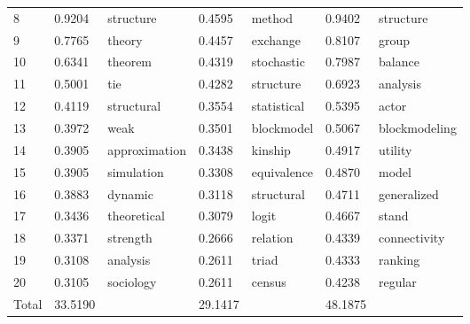 \documentclass[11pt]{article} %
\begin{document}
\begin{center}
\begin{longtable}{p{0.7cm}|p{1.3cm}|p{2.6cm}||p{1.3cm}|p{2.6cm}||p{1.3cm}|p{2.6cm}}
         8   &  0.9204   &  structure	 &     0.4595   &  method		 &     0.9402  &   structure \\
         9   &  0.7765   &  theory		 &     0.4457   &  exchange	 &     0.8107  &   group \\
        10   &  0.6341   &  theorem	 &     0.4319   &  stochastic	 &     0.7987  &   balance \\
        11   &  0.5001   &  tie		 &     0.4282   &  structure	 &     0.6923  &   analysis \\
        12   &  0.4119   &  structural	 &     0.3554   &  statistical	 &     0.5395  &   actor \\
        13   &  0.3972   &  weak		 &     0.3501   &  blockmodel	 &     0.5067  &   blockmodeling \\
        14   &  0.3905   &  approximation	 &     0.3438   &  kinship		 &     0.4917  &   utility \\
        15   &  0.3905   &  simulation	 &     0.3308   &  equivalence	 &     0.4870  &   model \\
        16   &  0.3883   &  dynamic	 &     0.3118   &  structural	 &     0.4711  &   generalized \\
        17   &  0.3436   &  theoretical	 &     0.3079   &  logit		 &     0.4667  &   stand \\
        18   &  0.3371   &  strength	 &     0.2666   &  relation	 &     0.4339  &   connectivity \\
        19   &  0.3108   &  analysis	 &     0.2611   &  triad		 &     0.4333  &   ranking \\
        20   &  0.3105   &  sociology	 &     0.2611   &  census		 &     0.4238  &   regular \\ \hline
Total        &  33.5190         &  	 & 	29.1417        &       	 & 	  48.1875       &        \\      \hline
\end{longtable}
\end{center}
\end{document}
